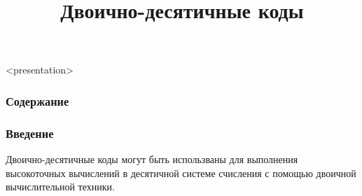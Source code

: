 


\title[2-10 коды]{Двоично-десятичные коды}

\setcounter{TaskSimpleCtr}{1}
\newcommand{\TaskSimpleNumber}{ \arabic{TaskSimpleCtr}) \addtocounter{TaskSimpleCtr}{1} }


\newcommand{\NaturalLabel}{\text{``\texttt{8421}''}}
\newcommand{\Natural}[1]{\NaturalLabel(#1)}

\newcommand{\PlusThreeLabel}{\text{``\texttt{8421+3}''}}
\newcommand{\PlusThree}[1]{\PlusThreeLabel(#1)}

\newcommand{\AikenLabel}{\text{``\texttt{2421}''}}
\newcommand{\Aiken}[1]{\AikenLabel(#1)}

\newcommand{\PentaLabel}{\text{``\texttt{3a+2}''}}
\newcommand{\Penta}[1]{\PentaLabel(#1)}




\begin{frame}<presentation>
    \frametitle{Содержание}
    \tableofcontents
\end{frame}


\begin{frame}
    \frametitle{Введение}

    \begin{block}{}
        Двоично-десятичные коды могут быть использваны для выполнения высокоточных вычислений в десятичной системе счисления с помощью двоичной вычислительной техники.
    \end{block}
\end{frame}

